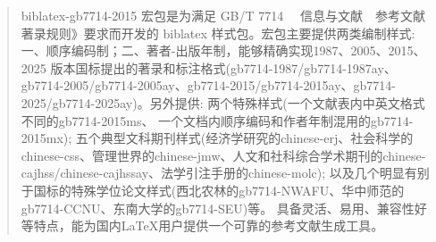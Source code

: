 \documentclass[11pt]{article} %
\begin{document}



\pagestyle{plain}



\dateformanual{\today}

\titleandauthor

\begin{quotation}
biblatex-gb7714-2015 宏包是为满足 GB/T 7714 ~~信息与文献~~参考文献著录规则》要求而开发的 biblatex 样式包。宏包主要提供两类编制样式: 一、顺序编码制；二、著者-出版年制，能够精确实现1987、2005、2015、2025 版本国标提出的著录和标注格式(gb7714-1987/gb7714-1987ay、 gb7714-2005/gb7714-2005ay、gb7714-2015/gb7714-2015ay、gb7714-2025/gb7714-2025ay)。另外提供: 两个特殊样式(一个文献表内中英文格式不同的gb7714-2015ms、 一个文档内顺序编码和作者年制混用的gb7714-2015mx); 五个典型文科期刊样式(经济学研究的chinese-erj、社会科学的chinese-css、管理世界的chinese-jmw、人文和社科综合学术期刊的chinese-cajhss/chinese-cajhssay、法学引注手册的chinese-molc);  以及几个明显有别于国标的特殊学位论文样式(西北农林的gb7714-NWAFU、华中师范的gb7714-CCNU、东南大学的gb7714-SEU)等。
具备灵活、易用、兼容性好等特点，能为国内\LaTeX{}用户提供一个可靠的参考文献生成工具。
\end{quotation}
\tableofcontents

\listoffigures
\listoftables
\listofegcode
\newlength{\textparwd}
\end{document}
